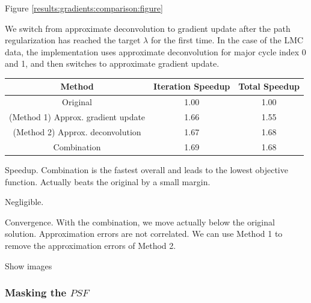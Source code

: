 Figure \ref{results:gradients:comparison:figure}

We switch from approximate deconvolution to gradient update after the path regularization has reached the target $\lambda$ for the first time. In the case of the LMC data, the implementation uses approximate deconvolution for major cycle index 0 and 1, and then switches to approximate gradient update.


\begin{center}
	\begin{tabular}{ c||c|c } 
		\hline
		Method & Iteration Speedup & Total Speedup \\ \hline \hline
		Original & 1.00 & 1.00 \\ 
		(Method 1) Approx. gradient update & 1.66 & 1.55 \\ 
		(Method 2) Approx. deconvolution & 1.67 & 1.68 \\ \hline
		Combination & 1.69 & 1.68 \\ 
		\hline
	\end{tabular}
	\label{results:gradients:comparison:speedup}
\end{center}
Speedup. Combination is the fastest overall and leads to the lowest objective function. Actually beats the original by a small margin.




Negligible.

Convergence. With the combination, we move actually below the original solution. 
Approximation errors are not correlated. We can use Method 1 to remove the approximation errors of Method 2.



Show images

\subsubsection{Masking the $PSF$}
